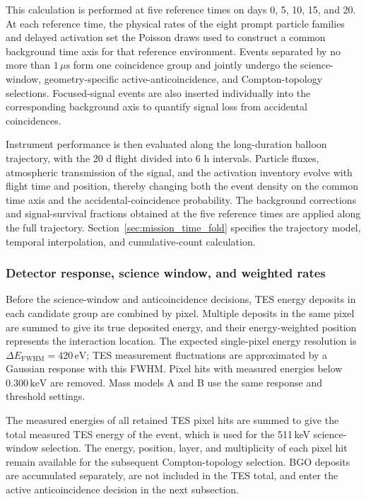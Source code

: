 \documentclass[11pt]{article}
\newcommand{\keV}{\ensuremath{\,\mathrm{keV}}}
\begin{document}
This calculation is performed at five reference times on days 0, 5, 10, 15,
and 20. At each reference time, the physical rates of the eight prompt
particle families and delayed activation set the
Poisson draws used to construct a common background time axis for that
reference environment. Events separated by no more than $1\,\mu\mathrm{s}$ form
one coincidence group and jointly undergo the science-window, geometry-specific
active-anticoincidence, and Compton-topology selections. Focused-signal events are
also inserted individually into the corresponding background axis to quantify
signal loss from accidental coincidences.

Instrument performance is then evaluated along the long-duration balloon
trajectory, with the 20 d flight divided into 6 h intervals. Particle fluxes,
atmospheric transmission of the signal, and the activation inventory evolve with flight
time and position, thereby changing both the event density on the common time
axis and the accidental-coincidence probability. The background corrections
and signal-survival fractions obtained at the five reference times are applied
along the full trajectory. Section~\ref{sec:mission_time_fold} specifies the
trajectory model, temporal interpolation, and cumulative-count calculation.

\subsubsection{Detector response, science window, and weighted rates}
\label{subsec:detector_response}

Before the science-window and anticoincidence decisions, TES energy deposits in
each candidate group are combined by pixel. Multiple deposits in the same pixel
are summed to give its true deposited energy, and their energy-weighted position
represents the interaction location. The expected single-pixel energy resolution
is $\Delta E_{\mathrm{FWHM}}=420\,\mathrm{eV}$; TES measurement fluctuations are
approximated by a Gaussian response with this FWHM. Pixel hits with measured
energies below $0.300\keV$ are removed. Mass models A and B use the same response
and threshold settings.

The measured energies of all retained TES pixel hits are summed to give the total
measured TES energy of the event, which is used for the 511\,keV science-window
selection. The energy, position, layer, and multiplicity of each pixel hit remain
available for the subsequent Compton-topology selection. BGO deposits are
accumulated separately, are not included in the TES total, and enter the active
anticoincidence decision in the next subsection.
\end{document}
